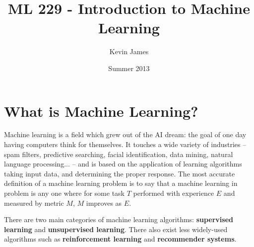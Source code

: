 \documentclass[12pt]{article}
\begin{document}
\title{ML 229 - Introduction to Machine Learning}
\author{Kevin James}
\date{\vspace{-2ex}Summer 2013}
\maketitle\HRule

\section*{What is Machine Learning?}
Machine learning is a field which grew out of the AI dream: the goal of one day having computers think for themselves. It touches a wide variety of industries -- spam filters, predictive searching, facial identification, data mining, natural language processing... -- and is based on the application of learning algorithms taking input data, and determining the proper response. The most accurate definition of a machine learning problem is to say that a machine learning in problem is any one where for some task $T$ performed with experience $E$ and measured by metric $M$, $M$ improves as $E$.

There are two main categories of machine learning algorithms: {\bf supervised learning} and {\bf unsupervised learning}. There also exist less widely-used algorithms such as {\bf reinforcement learning} and {\bf recommender systems}.
\end{document}
